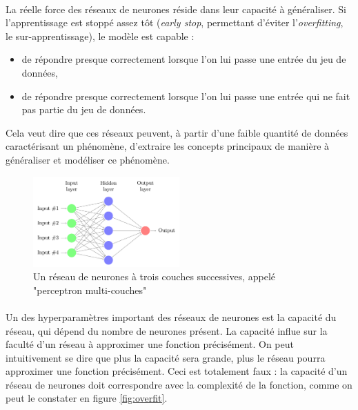 \documentclass[a4paper,10pt]{article}
\begin{document}
                \paragraph{}
                    La réelle force des réseaux de neurones réside dans leur capacité 
                    à généraliser. Si l'apprentissage est stoppé assez tôt (\textit{early stop}, permettant
                    d'éviter l'\textit{overfitting}, le sur-apprentissage), le modèle 
                    est capable : 
                    \begin{itemize}
                        \item de répondre presque correctement lorsque l'on lui passe une entrée du jeu 
                        de données, 
                        \item de répondre presque correctement lorsque l'on lui passe une entrée qui ne 
                        fait pas partie du jeu de données. 
                    \end{itemize}
                    Cela veut dire que ces réseaux peuvent, à partir d'une faible quantité de données 
                    caractérisant un phénomène, d'extraire les concepts principaux de manière à généraliser 
                    et modéliser ce phénomène. 
                    
            
                \begin{figure}[h!]
                    \centering
                    \includegraphics[width=0.5\textwidth]{neural-network.png}
                    \caption{Un réseau de neurones à trois couches successives, appelé "perceptron multi-couches"}
                    \label{fig:mlp}
                \end{figure}
                    
                    
                \paragraph{}
                    Un des hyperparamètres important des réseaux de neurones est la capacité du réseau, qui 
                    dépend du nombre de neurones présent. La capacité influe sur la faculté d'un réseau
                    à approximer une fonction précisément. On peut intuitivement se dire que plus la capacité 
                    sera grande, plus le réseau pourra approximer une fonction précisément. Ceci est totalement 
                    faux : la capacité d'un réseau de neurones doit correspondre avec la complexité de la fonction, 
                    comme on peut le constater en figure \ref{fig:overfit}. 
                    
\end{document}
